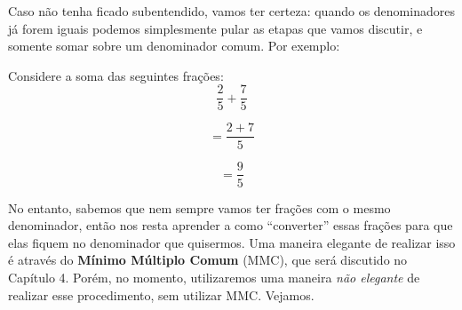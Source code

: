 Caso não tenha ficado subentendido, vamos ter certeza: quando os denominadores já forem iguais podemos simplesmente pular as etapas que vamos discutir, e somente somar sobre um denominador comum. Por exemplo:

\begin{exemplo}
    Considere a soma das seguintes frações:
    \begin{equation}
        \frac{2}{5}+\frac{7}{5}
    \end{equation}

    \begin{equation}
        =\frac{2+7}{5}
    \end{equation}

    \begin{equation}
        =\frac{9}{5}
    \end{equation}
\end{exemplo}

No entanto, sabemos que nem sempre vamos ter frações com o mesmo denominador, então nos resta aprender a como ``converter'' essas frações para que elas fiquem no denominador que quisermos. Uma maneira elegante de realizar isso é através do \textbf{Mínimo Múltiplo Comum} (MMC), que será discutido no Capítulo 4. Porém, no momento, utilizaremos uma maneira \textit{não elegante} de realizar esse procedimento, sem utilizar MMC. Vejamos.

